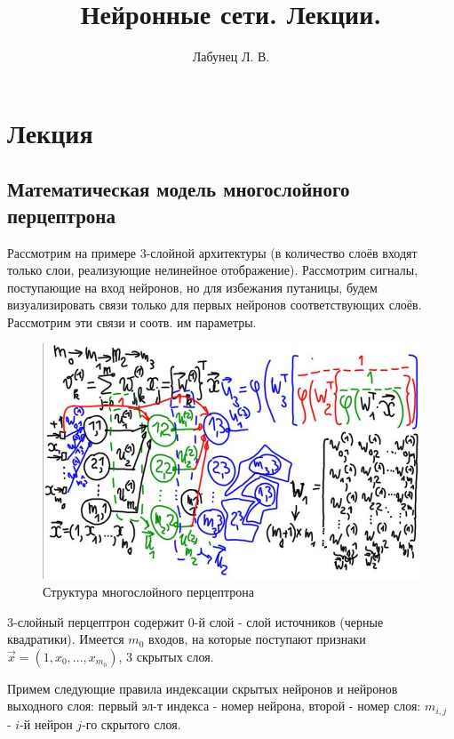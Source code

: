\documentclass{article}
\begin{document}
\author{Лабунец Л. В.}
\title{Нейронные сети. Лекции.}
\maketitle

\section*{Лекция}
\addtocounter{section}{1}

\subsection{Математическая модель многослойного перцептрона}

Рассмотрим на примере 3-слойной архитектуры (в количество слоёв входят только слои, реализующие нелинейное отображение).
Рассмотрим сигналы, поступающие на вход нейронов, но для избежания путаницы, будем визуализировать связи только для первых нейронов соответствующих слоёв.
Рассмотрим эти связи и соотв. им параметры.

\begin{figure}[htbp]
    \centering
    \includegraphics[width=\textwidth]{hyperflat_3_1.jpeg}
    \caption{Структура многослойного перцептрона}
\end{figure}

3-слойный перцептрон содержит 0-й слой - слой источников (черные квадратики). 
Имеется $m_{0}$ входов, на которые поступают признаки $\vec{x} = (1, x_0, ..., x_{m_{0}})$, 3 скрытых слоя.

Примем следующие правила индексации скрытых нейронов и нейронов выходного слоя:
первый эл-т индекса - номер нейрона, второй - номер слоя: $m_{i,j}$  - $i$-й нейрон $j$-го скрытого слоя.
\end{document}
